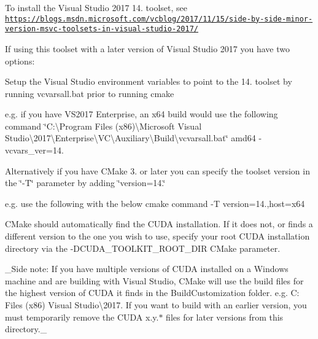 To install the Visual Studio 2017 14. toolset, see \href{https://blogs.msdn.microsoft.com/vcblog/2017/11/15/side-by-side-minor-version-msvc-toolsets-in-visual-studio-2017/}{\tt https\+://blogs.\+msdn.\+microsoft.\+com/vcblog/2017/11/15/side-\/by-\/side-\/minor-\/version-\/msvc-\/toolsets-\/in-\/visual-\/studio-\/2017/}

If using this toolset with a later version of Visual Studio 2017 you have two options\+:


\begin{DoxyEnumerate}
\item Setup the Visual Studio environment variables to point to the 14. toolset by running vcvarsall.\+bat prior to running cmake
\begin{DoxyItemize}
\item e.\+g. if you have V\+S2017 Enterprise, an x64 build would use the following command {\ttfamily \char`\"{}\+C\+:\textbackslash{}\+Program Files (x86)\textbackslash{}\+Microsoft Visual Studio\textbackslash{}2017\textbackslash{}\+Enterprise\textbackslash{}\+V\+C\textbackslash{}\+Auxiliary\textbackslash{}\+Build\textbackslash{}vcvarsall.\+bat\char`\"{} amd64 -\/vcvars\+\_\+ver=14.}
\end{DoxyItemize}
\item Alternatively if you have C\+Make 3. or later you can specify the toolset version in the \char`\"{}-\/\+T\char`\"{} parameter by adding \char`\"{}version=14.\char`\"{}
\begin{DoxyItemize}
\item e.\+g. use the following with the below cmake command {\ttfamily -\/T version=14.,host=x64}
\end{DoxyItemize}
\end{DoxyEnumerate}

C\+Make should automatically find the C\+U\+DA installation. If it does not, or finds a different version to the one you wish to use, specify your root C\+U\+DA installation directory via the -\/\+D\+C\+U\+D\+A\+\_\+\+T\+O\+O\+L\+K\+I\+T\+\_\+\+R\+O\+O\+T\+\_\+\+D\+IR C\+Make parameter.

\+\_\+\+Side note\+: If you have multiple versions of C\+U\+DA installed on a Windows machine and are building with Visual Studio, C\+Make will use the build files for the highest version of C\+U\+DA it finds in the Build\+Customization folder. e.\+g. C\+: Files (x86) Visual Studio\textbackslash{}2017. If you want to build with an earlier version, you must temporarily remove the \textquotesingle{}C\+U\+DA x.\+y.$\ast$\textquotesingle{} files for later versions from this directory.\+\_\+

